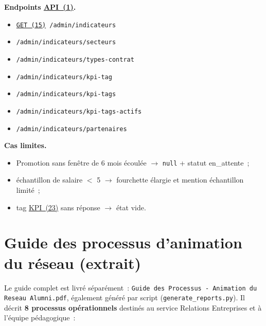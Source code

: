 \documentclass[12pt,a4paper]{report}
\begin{document}
\textbf{Endpoints \hyperlink{abbr-API}{API~(1)}.}
\begin{itemize}
  \item \texttt{\hyperlink{abbr-GET}{GET~(15)} /admin/indicateurs}
  \item \texttt{/admin/indicateurs/secteurs}
  \item \texttt{/admin/indicateurs/types-contrat}
  \item \texttt{/admin/indicateurs/kpi-tag}
  \item \texttt{/admin/indicateurs/kpi-tags}
  \item \texttt{/admin/indicateurs/kpi-tags-actifs}
  \item \texttt{/admin/indicateurs/partenaires}
\end{itemize}

\textbf{Cas limites.}
\begin{itemize}
  \item Promotion sans fenêtre de 6 mois écoulée $\rightarrow$ \texttt{null} + statut \og{}en\_attente\fg{}~;
  \item échantillon de salaire $<$ 5 $\rightarrow$ fourchette élargie et mention \og{}échantillon limité\fg{}~;
  \item tag \hyperlink{abbr-KPI}{KPI~(23)} sans réponse $\rightarrow$ état vide.
\end{itemize}

\chapter{Guide des processus d'animation du réseau (extrait)}

Le guide complet est livré séparément~: \texttt{Guide des Processus - Animation du Reseau Alumni.pdf}, également généré par script (\texttt{generate\_reports.py}). Il décrit \textbf{8 processus opérationnels} destinés au service Relations Entreprises et à l'équipe pédagogique~:
\end{document}
